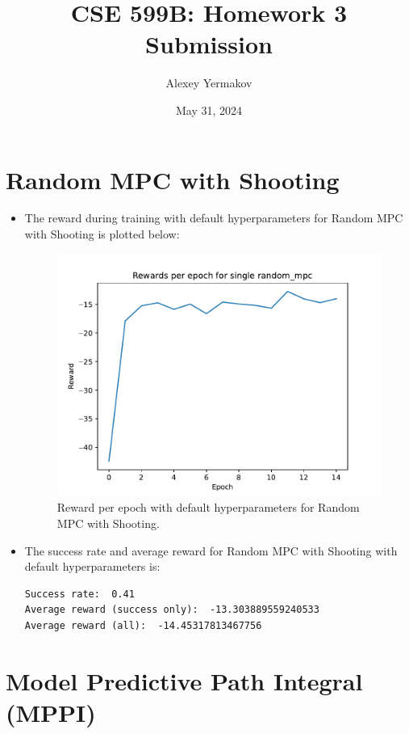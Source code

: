\documentclass[12pt]{article}
\title{CSE 599B: Homework 3 Submission}
\author{Alexey Yermakov}
\date{May 31, 2024}
\newcommand{\0}{\boldsymbol{0}}
\newcommand{\1}{\boldsymbol{1}}
\begin{document}
\maketitle

\section{Random MPC with Shooting}

\begin{itemize}
    \item The reward during training with default hyperparameters for Random MPC with Shooting is plotted below:

    \begin{figure}[H]
        \centering
        \includegraphics[width=.7\linewidth]{../figs/single_random_mpc.pdf}
        \caption{Reward per epoch with default hyperparameters for Random MPC with Shooting.}
        \label{fig:fig1}
    \end{figure}

    \item The success rate and average reward for Random MPC with Shooting with default hyperparameters is:
    \begin{verbatim}
Success rate:  0.41
Average reward (success only):  -13.303889559240533
Average reward (all):  -14.45317813467756
    \end{verbatim}
\end{itemize}

\newpage

\section{Model Predictive Path Integral (MPPI)}
\end{document}
